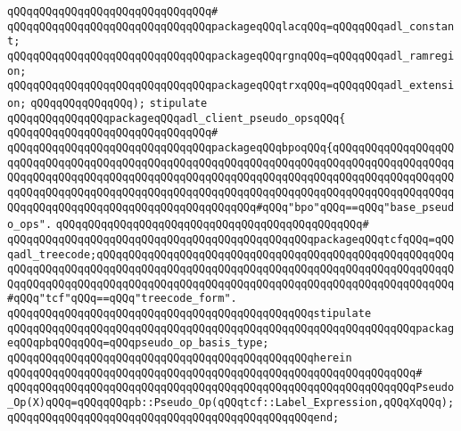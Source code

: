 \verb|qQQqqQQqqQQqqQQqqQQqqQQqqQQqqQQq#|\newline
\verb|qQQqqQQqqQQqqQQqqQQqqQQqqQQqqQQqpackageqQQqlacqQQq=qQQqqQQqadl_constant;|\newline
\verb|qQQqqQQqqQQqqQQqqQQqqQQqqQQqqQQqpackageqQQqrgnqQQq=qQQqqQQqadl_ramregion;|\newline
\verb|qQQqqQQqqQQqqQQqqQQqqQQqqQQqqQQqpackageqQQqtrxqQQq=qQQqqQQqadl_extension;|\newline
\verb|qQQqqQQqqQQqqQQq);|\newline
\newline
\newline
\verb|stipulate|\newline
\verb|qQQqqQQqqQQqqQQqpackageqQQqadl_client_pseudo_opsqQQq{|\newline
\verb|qQQqqQQqqQQqqQQqqQQqqQQqqQQqqQQq#|\newline
\verb|qQQqqQQqqQQqqQQqqQQqqQQqqQQqqQQqpackageqQQqbpoqQQq{qQQqqQQqqQQqqQQqqQQqqQQqqQQqqQQqqQQqqQQqqQQqqQQqqQQqqQQqqQQqqQQqqQQqqQQqqQQqqQQqqQQqqQQqqQQqqQQqqQQqqQQqqQQqqQQqqQQqqQQqqQQqqQQqqQQqqQQqqQQqqQQqqQQqqQQqqQQqqQQqqQQqqQQqqQQqqQQqqQQqqQQqqQQqqQQqqQQqqQQqqQQqqQQqqQQqqQQqqQQqqQQqqQQqqQQqqQQqqQQqqQQqqQQqqQQqqQQqqQQqqQQqqQQq#qQQq"bpo"qQQq==qQQq"base_pseudo_ops".|\newline
\verb|qQQqqQQqqQQqqQQqqQQqqQQqqQQqqQQqqQQqqQQqqQQqqQQq#|\newline
\verb|qQQqqQQqqQQqqQQqqQQqqQQqqQQqqQQqqQQqqQQqqQQqqQQqpackageqQQqtcfqQQq=qQQqadl_treecode;qQQqqQQqqQQqqQQqqQQqqQQqqQQqqQQqqQQqqQQqqQQqqQQqqQQqqQQqqQQqqQQqqQQqqQQqqQQqqQQqqQQqqQQqqQQqqQQqqQQqqQQqqQQqqQQqqQQqqQQqqQQqqQQqqQQqqQQqqQQqqQQqqQQqqQQqqQQqqQQqqQQqqQQqqQQqqQQqqQQqqQQqqQQqqQQqqQQq#qQQq"tcf"qQQq==qQQq"treecode_form".|\newline
\verb|qQQqqQQqqQQqqQQqqQQqqQQqqQQqqQQqqQQqqQQqqQQqqQQqstipulate|\newline
\verb|qQQqqQQqqQQqqQQqqQQqqQQqqQQqqQQqqQQqqQQqqQQqqQQqqQQqqQQqqQQqqQQqpackageqQQqpbqQQqqQQq=qQQqpseudo_op_basis_type;|\newline
\verb|qQQqqQQqqQQqqQQqqQQqqQQqqQQqqQQqqQQqqQQqqQQqqQQqherein|\newline
\verb|qQQqqQQqqQQqqQQqqQQqqQQqqQQqqQQqqQQqqQQqqQQqqQQqqQQqqQQqqQQqqQQq#|\newline
\verb|qQQqqQQqqQQqqQQqqQQqqQQqqQQqqQQqqQQqqQQqqQQqqQQqqQQqqQQqqQQqqQQqPseudo_Op(X)qQQq=qQQqqQQqpb::Pseudo_Op(qQQqtcf::Label_Expression,qQQqXqQQq);|\newline
\verb|qQQqqQQqqQQqqQQqqQQqqQQqqQQqqQQqqQQqqQQqqQQqqQQqend;|\newline

